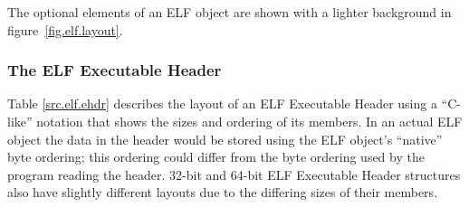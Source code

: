 \documentclass[a4paper,pdftex]{book}
\newcommand{\elfdatastructure}[1]{\textsf{#1}}
\begin{document}
The optional elements of an ELF object are shown with a lighter
background in figure~\vref{fig.elf.layout}.

\subsubsection{The ELF Executable Header}\label{sec.ehdr}
Table \vref{src.elf.ehdr} describes the layout of an ELF
\elfdatastructure{Executable Header} using a ``C-like'' notation that
shows the sizes and ordering of its
members. In an actual ELF object the
data in the header would be stored using the ELF object's ``native''
byte ordering; this ordering could differ from the byte ordering used
by the program reading the header. 32-bit and 64-bit ELF
\elfdatastructure{Executable Header} structures also have slightly
different layouts due to the differing sizes of their members.
\end{document}
